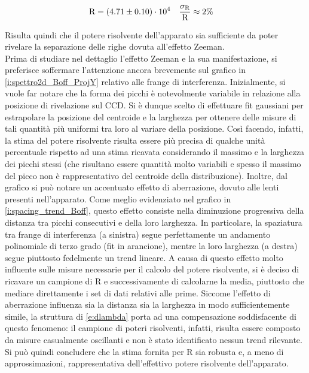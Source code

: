 \documentclass[twocolumn,10pt]{asme2ej}
\begin{document}
\vspace{-15pt}
\begin{align*}
    \text{R} &= (4.71 \pm 0.10)\cdot 10^4  & \frac{\sigma_{\text{R}}}{\text{R}} &\approx 2\%
    \label{e:R_result}
\vspace{-10pt}
\end{align*}


Risulta quindi che il potere risolvente dell'apparato sia sufficiente da poter rivelare la separazione delle righe
dovuta all'effetto Zeeman. \\
\indent Prima di studiare nel dettaglio l'effetto Zeeman e la sua manifestazione, si preferisce soffermare l'attenzione
ancora brevemente sul grafico in \autoref{i:spettro2d_Boff_ProjY} relativo alle frange di interferenza. Inizialmente, si
vuole far notare che la forma dei picchi è notevolmente variabile in relazione alla posizione di rivelazione sul CCD. Si
è dunque scelto di effettuare fit gaussiani per estrapolare la posizione del centroide e la larghezza per ottenere delle
misure di tali quantità più uniformi tra loro al variare della posizione. Così facendo, infatti, la stima del potere
risolvente risulta essere più precisa di qualche unità percentuale rispetto ad una stima ricavata considerando il
massimo e la larghezza dei picchi stessi (che risultano essere quantità molto variabili e spesso il massimo del picco
non è rappresentativo del centroide della distribuzione). Inoltre, dal grafico si può notare un accentuato effetto di
aberrazione, dovuto alle lenti presenti nell'apparato. Come meglio evidenziato nel grafico in
\autoref{i:spacing_trend_Boff}, questo effetto consiste nella diminuzione progressiva della distanza tra picchi
consecutivi e della loro larghezza. In particolare, la spaziatura tra frange di interferenza (a sinistra) segue
perfettamente un andamento polinomiale di terzo grado (fit in arancione), mentre la loro larghezza (a destra) segue
piuttosto fedelmente un trend lineare. A causa di questo effetto molto influente sulle misure necessarie per il calcolo
del potere risolvente, si è deciso di ricavare un campione di R e successivamente di calcolarne la media, piuttosto che
mediare direttamente i set di dati relativi alle prime. Siccome l'effetto di aberrazione influenza sia la distanza sia
la larghezza in modo sufficientemente simile, la struttura di \autoref{e:dlambda} porta ad una compensazione
soddisfacente di questo fenomeno: il campione di poteri risolventi, infatti, risulta essere composto da misure
casualmente oscillanti e non è stato identificato nessun trend rilevante. Si può quindi concludere che la stima fornita
per R sia robusta e, a meno di approssimazioni, rappresentativa dell'effettivo potere risolvente dell'apparato.
\end{document}
